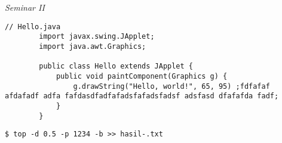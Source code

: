 \documentclass{lib/myskripsi}
\begin{document}
    \noindent
    \textit{Seminar II}
    \coverproposal



    \blindtext

    \begin{lstlisting}[frame=single, style=base]
        // Hello.java
        import javax.swing.JApplet;
        import java.awt.Graphics;
        
        public class Hello extends JApplet {
            public void paintComponent(Graphics g) {
                g.drawString("Hello, world!", 65, 95) ;fdfafaf afdafadf adfa fafdasdfadfafadsfafadsfadsf adsfasd dfafafda fadf;
            }    
        }
        \end{lstlisting}

    \blindtext
        

    \begin{lstlisting}[frame=single, style=terminal]
    $ top -d 0.5 -p 1234 -b >> hasil-.txt    
    \end{lstlisting}
\end{document}
